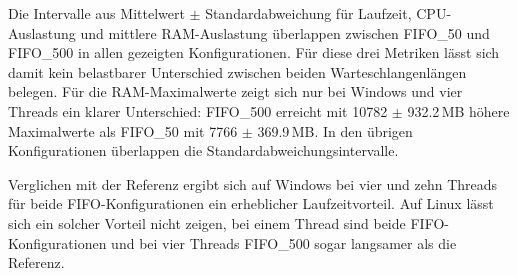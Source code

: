 \begin{sloppypar}
\begin{table}[H]
\caption{Laufzeit-, \acs{CPU}- und \acs{RAM}-Metriken des \acs{FIFO}\_500-Schedulers für Linux und Windows bei einem, vier und zehn Threads, angegeben als Mittelwerte $\pm$ Standardabweichung aus $n=20$ Läufen}
\label{tab:fifo500-uebersicht-system}
\centering
\begingroup
\setlength{\tabcolsep}{4pt}
\endgroup
\end{table}

\noindent Die Intervalle aus Mittelwert $\pm$ Standardabweichung für Laufzeit, 
\acs{CPU}-Auslastung und mittlere \acs{RAM}-Auslastung überlappen zwischen \acs{FIFO}\_50 und \acs{FIFO}\_500 
in allen gezeigten Konfigurationen. Für diese drei Metriken lässt sich damit kein belastbarer 
Unterschied zwischen beiden Warteschlangenlängen belegen. 
Für die \acs{RAM}-Maximalwerte zeigt sich nur bei Windows und vier Threads ein klarer Unterschied: 
\acs{FIFO}\_500 erreicht mit 10782 $\pm$ 932.2\,MB höhere Maximalwerte als \acs{FIFO}\_50 mit 7766 $\pm$ 369.9\,MB. 
In den übrigen Konfigurationen überlappen die Standardabweichungsintervalle.

\vspace{7.56mm}

\noindent Verglichen mit der Referenz ergibt sich auf Windows bei vier und zehn Threads für beide \acs{FIFO}-Konfigurationen ein erheblicher Laufzeitvorteil. 
Auf Linux lässt sich ein solcher Vorteil nicht zeigen, bei einem Thread sind beide \acs{FIFO}-Konfigurationen und bei vier Threads \acs{FIFO}\_500 sogar langsamer als die Referenz.


\end{sloppypar}
